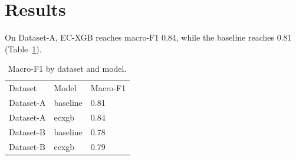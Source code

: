 \section{Results}
On Dataset-A, EC-XGB reaches macro-F1 0.84, while the baseline reaches 0.81 (Table~\ref{tab:main}).

\begin{table}[t]
\caption{Macro-F1 by dataset and model.}
\label{tab:main}
\begin{tabular}{lll}
Dataset & Model & Macro-F1 \\
Dataset-A & baseline & 0.81 \\
Dataset-A & ecxgb & 0.84 \\
Dataset-B & baseline & 0.78 \\
Dataset-B & ecxgb & 0.79 \\
\end{tabular}
\end{table}
